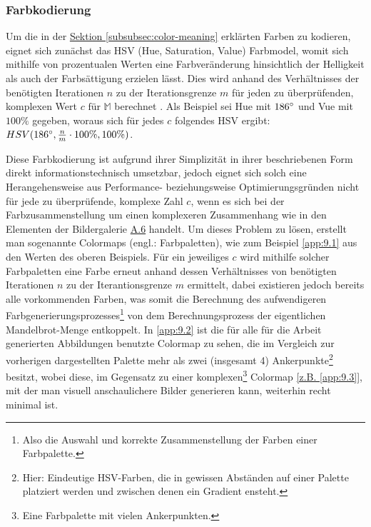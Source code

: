 \subsubsection{Farbkodierung}\label{subsubsec:color-coding}

Um die in der \hyperref[subsubsec:color-meaning]{Sektion \ref{subsubsec:color-meaning}}
erklärten Farben zu kodieren, eignet sich zunächst das HSV (Hue, Saturation, Value)
Farbmodel, womit sich mithilfe von prozentualen Werten eine
Farbveränderung hinsichtlich der Helligkeit als auch der Farbsättigung erzielen lässt.
Dies wird anhand des Verhältnisses der benötigten Iterationen $n$ zu der Iterationsgrenze $m$
für jeden zu überprüfenden, komplexen Wert $c \text{ für } \mathbb{M}$
berechnet \cite{robert_p_color_2022}.
Als Beispiel sei Hue mit $186\degree$ und Vue mit $100\%$ gegeben, woraus
sich für jedes $c$ folgendes HSV ergibt:
$ HSV(186\degree, \frac{n}{m} \cdot 100\%, 100\%)$.

Diese Farbkodierung ist aufgrund ihrer Simplizität in ihrer beschriebenen
Form direkt informationstechnisch umsetzbar, jedoch eignet sich solch eine
Herangehensweise aus Performance- beziehungsweise Optimierungsgründen nicht
für jede zu überprüfende, komplexe Zahl $c$, wenn es sich bei der
Farbzusammenstellung um einen komplexeren Zusammenhang wie in den Elementen
der Bildergalerie \hyperref[app:6]{A.6} handelt.
Um dieses Problem zu lösen, erstellt man sogenannte Colormaps
(engl.: Farbpaletten), wie zum Beispiel \hyperref[app:9.1]{\ref{app:9.1}}
aus den Werten des oberen Beispiels.
Für ein jeweiliges $c$ wird mithilfe solcher Farbpaletten eine Farbe erneut anhand
dessen Verhältnisses von benötigten Iterationen $n$ zu der Iterantionsgrenze $m$
ermittelt, dabei existieren jedoch bereits alle vorkommenden Farben, was somit
die Berechnung des aufwendigeren Farbgenerierungsprozesses\footnote{
  Also die Auswahl und korrekte Zusammenstellung der Farben einer Farbpalette.
}
von dem Berechnungsprozess der eigentlichen Mandelbrot-Menge entkoppelt.
In \hyperref[app:9.2]{\ref{app:9.2}} ist die für alle für die Arbeit generierten
Abbildungen benutzte Colormap zu sehen, die im Vergleich zur vorherigen
dargestellten Palette mehr als zwei (insgesamt 4) Ankerpunkte\footnote{
  Hier: Eindeutige HSV-Farben, die in gewissen Abständen auf einer Palette
  platziert werden und zwischen denen ein Gradient ensteht.
} besitzt, wobei diese, im Gegensatz zu einer komplexen\footnote{
  Eine Farbpalette mit vielen Ankerpunkten.
} Colormap \hyperref[app:9.3]{[z.B. \ref{app:9.3}]},
mit der man visuell anschaulichere Bilder generieren kann,
weiterhin recht minimal ist.
